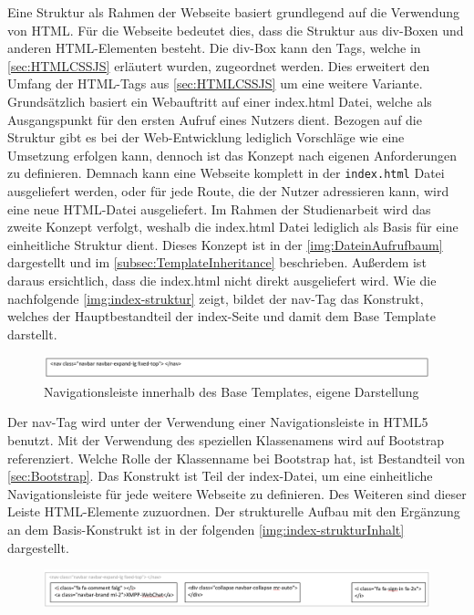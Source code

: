 \documentclass[a4paper,titlepage,halfparskip,12pt]{scrreprt}
\begin{document}
\begin{onehalfspacing}
Eine Struktur als Rahmen der Webseite basiert grundlegend auf die Verwendung von \ac{HTML}. Für die Webseite bedeutet dies, dass die Struktur aus div-Boxen und anderen \ac{HTML}-Elementen besteht. Die div-Box kann den Tags, welche in \autoref{sec:HTMLCSSJS} erläutert wurden, zugeordnet werden. Dies erweitert den Umfang der \ac{HTML}-Tags aus \autoref{sec:HTMLCSSJS} um eine weitere Variante. Grundsätzlich basiert ein Webauftritt auf einer index.html Datei, welche als Ausgangspunkt für den ersten Aufruf eines Nutzers dient. Bezogen auf die Struktur gibt es bei der Web-Entwicklung lediglich Vorschläge wie eine Umsetzung erfolgen kann, dennoch ist das Konzept nach eigenen Anforderungen zu definieren. Demnach kann eine Webseite komplett in der \texttt{index.html} Datei ausgeliefert werden, oder für jede Route, die der Nutzer adressieren kann, wird eine neue \ac{HTML}-Datei ausgeliefert. Im Rahmen der Studienarbeit wird das zweite Konzept verfolgt, weshalb die index.html Datei lediglich als Basis für eine einheitliche Struktur dient. Dieses Konzept ist in der \autoref{img:DateinAufrufbaum} dargestellt und im \autoref{subsec:TemplateInheritance} beschrieben. Außerdem ist daraus ersichtlich, dass die index.html nicht direkt ausgeliefert wird. Wie die nachfolgende \autoref{img:index-struktur} zeigt, bildet der nav-Tag das Konstrukt, welches der Hauptbestandteil der index-Seite und damit dem Base Template darstellt.
\begin{figure}[h]
	\centering
	\includegraphics[width=\linewidth]{images/indexbody}
	\caption{Navigationsleiste innerhalb des Base Templates, eigene Darstellung}
	\label{img:index-struktur}
\end{figure}
Der nav-Tag wird unter der Verwendung einer Navigationsleiste in HTML5 benutzt. Mit der Verwendung des speziellen Klassenamens wird auf Bootstrap referenziert. Welche Rolle der Klassenname bei Bootstrap hat, ist Bestandteil von \autoref{sec:Bootstrap}. Das Konstrukt ist Teil der index-Datei, um eine einheitliche Navigationsleiste für jede weitere Webseite zu definieren. Des Weiteren sind dieser Leiste HTML-Elemente zuzuordnen. Der strukturelle Aufbau mit den Ergänzung an dem Basis-Konstrukt ist in der folgenden \autoref{img:index-strukturInhalt} dargestellt.
\begin{figure}[h]
	\centering
	\includegraphics[width=\linewidth]{images/indexbodyInhalt}

\end{figure}
\end{onehalfspacing}
\end{document}

